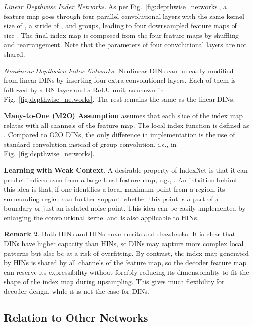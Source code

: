 \documentclass[10pt,twocolumn,letterpaper]{article}
\begin{document}
\vspace{3pt}
\noindent\textit{Linear Depthwise Index Networks.}  As per Fig.~\ref{fig:depthwise_networks}, a feature map goes through four parallel convolutional layers with the same kernel size of , a stride of , and  groups, leading to four downsampled feature maps of size . The final index map is composed from the four feature maps by shuffling and rearrangement. Note that the parameters of four convolutional layers are not shared.

\vspace{3pt}
\noindent\textit{Nonlinear Depthwise Index Networks.} Nonlinear DINs can be easily modified from linear DINs by inserting four extra convolutional layers. Each of them is followed by a BN layer and a ReLU unit, as shown in Fig.~\ref{fig:depthwise_networks}. The rest remains the same as the linear DINs.

\vspace{3pt}
\noindent\textbf{Many-to-One (M2O) Assumption} assumes that each slice of the index map relates with all channels of the feature map. The local index function is defined as . Compared to O2O DINs, the only difference in implementation is the use of standard convolution instead of group convolution, i.e.,  in Fig.~\ref{fig:depthwise_networks}.

\vspace{3pt}
\noindent\textbf{Learning with Weak Context}. A desirable property of IndexNet is that it can predict indices even from a large local feature map, e.g., . An intuition behind this idea is that, if one identifies a local maximum point from a  region, its surrounding  region can further support whether this point is a part of a boundary or just an isolated noise point. This idea can be easily implemented by enlarging the convolutional kernel and is also applicable to HINs.

\vspace{3pt}
\noindent\textbf{Remark 2}. Both HINs and DINs have merits and drawbacks. It is clear that DINs have higher capacity than HINs, so DINs may capture more complex local patterns but also be at a risk of overfitting. By contrast, the index map generated by HINs is shared by all channels of the feature map, so the decoder feature map can reserve its expressibility without forcibly reducing its dimensionality to fit the shape of the index map during upsampling. This gives much flexibility for decoder design, while it is not the case for DINs.

\subsection{Relation to Other Networks}
\end{document}
